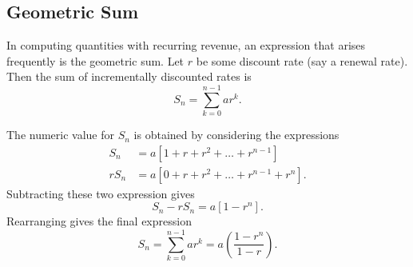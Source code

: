 \documentclass[paper=a4, fontsize=11pt abstract]{scrartcl}
\numberwithin{equation}{section}		%
\numberwithin{figure}{section}			%
\numberwithin{table}{section}				%
\begin{document}
\begin{appendices}

\pagebreak

\section{Geometric Sum}\label{section:first_appendix_section}
In computing quantities with recurring revenue, an expression that arises frequently is the geometric sum.
Let $r$ be some discount rate (say a renewal rate).  Then the sum of incrementally discounted rates is
\begin{equation}
    S_n = \sum_{k=0}^{n-1} ar^{k}.
\end{equation}

The numeric value for $S_n$ is obtained by considering the expressions
\begin{align}
    S_n &= a\left[1 + r + r^2 + \ldots  + r^{n-1} \right] \\
    r S_n &= a\left[0 +r + r^2 + \ldots + r^{n-1} + r^{n} \right].
\end{align}
Subtracting these two expression gives
\begin{equation}
    S_n - r S_n = a\left[ 1 - r^{n}\right].
\end{equation}
Rearranging gives the final expression
\begin{equation}
    S_n = \sum_{k=0}^{n-1} ar^{k} = a\left(\frac{1-r^n}{1-r}\right).
\end{equation}


\end{appendices}


\end{document}
